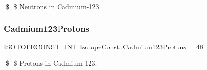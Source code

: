 \$ \$ Neutrons in Cadmium-\/123. \mbox{\label{group___isotope_const-_cadmium-_cd123_gae5c7774e09cbbec7777173e59c6b6498}} 
\subsubsection{\texorpdfstring{Cadmium123\+Protons}{Cadmium123Protons}}
{\footnotesize\ttfamily \mbox{\hyperlink{group___isotope_const-_macros_ga5f18360b3e99483a35c32d789e62621c}{I\+S\+O\+T\+O\+P\+E\+C\+O\+N\+S\+T\+\_\+\+I\+NT}} Isotope\+Const\+::\+Cadmium123\+Protons = 48}

\$ \$ Protons in Cadmium-\/123. 